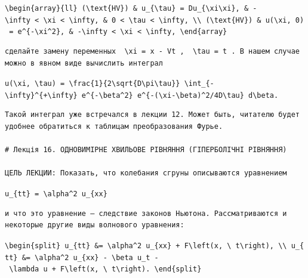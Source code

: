 \documentclass[
  ukrainian,
]{article}
\begin{document}
\texttt{\textbackslash{}begin\{array\}\{ll\}\ (\textbackslash{}text\{HV\})\ \&\ u\_\{\textbackslash{}tau\}\ =\ Du\_\{\textbackslash{}xi\textbackslash{}xi\},\ \&\ -\textbackslash{}infty\ \textless{}\ \textbackslash{}xi\ \textless{}\ \textbackslash{}infty,\ \&\ 0\ \textless{}\ \textbackslash{}tau\ \textless{}\ \textbackslash{}infty,\ \textbackslash{}\textbackslash{}\ (\textbackslash{}text\{HV\})\ \&\ u(\textbackslash{}xi,\ 0)\ =\ e\^{}\{-\textbackslash{}xi\^{}2\},\ \&\ -\textbackslash{}infty\ \textless{}\ \textbackslash{}xi\ \textless{}\ \textbackslash{}infty,\ \textbackslash{}end\{array\}}

\begin{verbatim}
сделайте замену переменных  \xi = x - Vt ,  \tau = t . В нашем случае можно в явном виде вычислить интеграл
\end{verbatim}

\texttt{u(\textbackslash{}xi,\ \textbackslash{}tau)\ =\ \textbackslash{}frac\{1\}\{2\textbackslash{}sqrt\{D\textbackslash{}pi\textbackslash{}tau\}\}\ \textbackslash{}int\_\{-\textbackslash{}infty\}\^{}\{+\textbackslash{}infty\}\ e\^{}\{-\textbackslash{}beta\^{}2\}\ e\^{}\{-(\textbackslash{}xi-\textbackslash{}beta)\^{}2/4D\textbackslash{}tau\}\ d\textbackslash{}beta.}

\begin{verbatim}
Такой интеграл уже встречался в лекции 12. Может быть, читателю будет удобнее обратиться к таблицам преобразования Фурье.

# Лекція 16. ОДНОВИМІРНЕ ХВИЛЬОВЕ РІВНЯННЯ (ГІПЕРБОЛІЧНІ РІВНЯННЯ)

ЦЕЛЬ ЛЕКЦИИ: Показать, что колебания сгруны описываются уравнением
\end{verbatim}

\texttt{u\_\{tt\}\ =\ \textbackslash{}alpha\^{}2\ u\_\{xx\}}

\begin{verbatim}
и что это уравнение — следствие законов Ньютона. Рассматриваются и некоторые другие виды волнового уравнения:
\end{verbatim}

\texttt{\textbackslash{}begin\{split\}\ u\_\{tt\}\ \&=\ \textbackslash{}alpha\^{}2\ u\_\{xx\}\ +\ F\textbackslash{}left(x,\ \textbackslash{}\ t\textbackslash{}right),\ \textbackslash{}\textbackslash{}\ u\_\{tt\}\ \&=\ \textbackslash{}alpha\^{}2\ u\_\{xx\}\ -\ \textbackslash{}beta\ u\_t\ -\ \textbackslash{}lambda\ u\ +\ F\textbackslash{}left(x,\ \textbackslash{}\ t\textbackslash{}right).\ \textbackslash{}end\{split\}}
\end{document}
